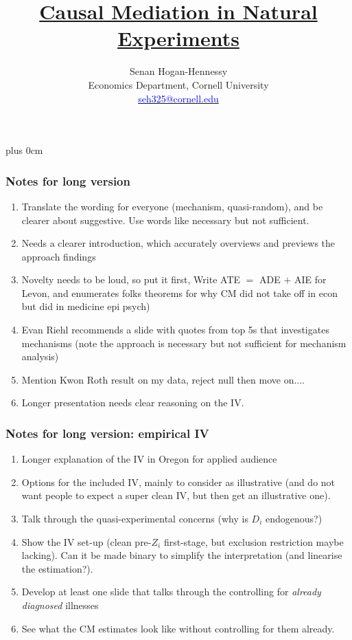 \documentclass[dvipsnames,handout]{beamer} %
\title{\color{titleText}
    \href{https://raw.githubusercontent.com/shoganhennessy/mediation-natural-experiment/main/mediation-natural-experiment-2025.pdf}{Causal Mediation in Natural Experiments}
}
\author[Senan Hogan-Hennessy, Cornell University]{
    Senan Hogan-Hennessy \\
    Economics Department, Cornell University \\ %
    \href{mailto:seh325@cornell.edu}{\textcolor{blue}{seh325@cornell.edu}}
}
\date{} %
\renewcommand{\raggedright}{\leftskip=0pt \rightskip=0pt plus 0cm}
\begin{document}
\raggedright
\begin{frame}
    \frametitle{Notes for long version}
    \begin{enumerate}
        \item Translate the wording for everyone (mechanism, quasi-random), and be clearer about suggestive.  Use words like necessary but not sufficient.
        \item Needs a clearer introduction, which accurately overviews and previews the approach findings
        \item Novelty needs to be loud, so put it first, Write ATE $=$ ADE $+$ AIE for Levon, and enumerates folks theorems for why CM did not take off in econ but did in medicine epi psych)
        \item Evan Riehl recommends a slide with quotes from top 5s that investigates mechanisms (note the approach is necessary but not sufficient for mechanism analysis)
        \item Mention Kwon Roth result on my data, reject null then move on....
        \item Longer presentation needs clear reasoning on the IV.
    \end{enumerate}
\end{frame}
\begin{frame}
    \frametitle{Notes for long version: empirical IV}
    \begin{enumerate}
        \item Longer explanation of the IV in Oregon for applied audience
        \item Options for the included IV, mainly to consider as illustrative (and do not want people to expect a super clean IV, but then get an illustrative one).
        \item Talk through the quasi-experimental concerns (why is $D_i$ endogenous?)
        \item Show the IV set-up (clean pre-$Z_i$ first-stage, but exclusion restriction maybe lacking).  Can it be made binary to simplify the interpretation (and linearise the estimation?).
        \item Develop at least one slide that talks through the controlling for \textit{already diagnosed} illnesses
        \item See what the CM estimates look like without controlling for them already.
    \end{enumerate}
\end{frame}
\end{document}
